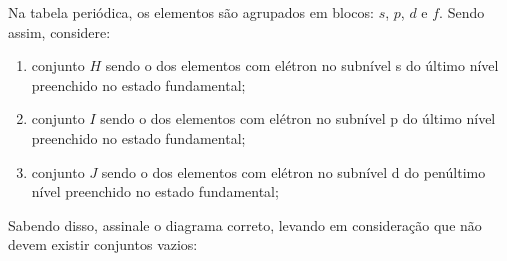 Na tabela periódica, os elementos são agrupados em blocos: $s$, $p$, $d$ e $f$.
Sendo assim, considere:

\begin{enumerate}[label = (\alph*)]
	\item conjunto $H$ sendo o dos elementos com elétron no subnível s do último nível preenchido no estado fundamental;
	\item conjunto $I$ sendo o dos elementos com elétron no subnível p do último nível preenchido no estado fundamental;
	\item conjunto $J$ sendo o dos elementos com elétron no subnível d do penúltimo
nível preenchido no estado fundamental;
\end{enumerate}

Sabendo disso, assinale o diagrama correto, levando em consideração que não devem existir conjuntos vazios:

\begin{enumerate*}[label = (\alph*)]
	\item \def\svgwidth{0.15\textwidth} 
	\item \def\svgwidth{0.15\textwidth} 
	\item \def\svgwidth{0.15\textwidth} 
\end{enumerate*}

\begin{enumerate*}[resume*]
	\item \def\svgwidth{0.15\textwidth} 
	\item \def\svgwidth{0.15\textwidth} 
\end{enumerate*}


